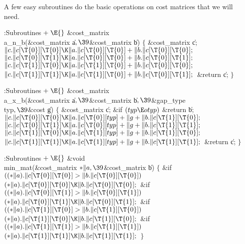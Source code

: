 A few easy subroutines do the basic operations on cost
matrices that we will
need.

\Y\B\4:Subroutines\X${}\mathrel+\E{}$\6
\&{cost\_matrix} \\{a\_n\_b}(\&{cost\_matrix} \|a${},\39{}$\&{cost\_matrix} %
\|b)\6
${}\{{}$\1\6
\&{cost\_matrix} \|c;\7
${}\|c.\|c[\T{0}][\T{0}]\K\|a.\|c[\T{0}][\T{0}]+\|b.\|c[\T{0}][\T{0}];{}$\6
${}\|c.\|c[\T{0}][\T{1}]\K\|a.\|c[\T{0}][\T{0}]+\|b.\|c[\T{0}][\T{1}];{}$\6
${}\|c.\|c[\T{1}][\T{0}]\K\|a.\|c[\T{1}][\T{0}]+\|b.\|c[\T{0}][\T{0}];{}$\6
${}\|c.\|c[\T{1}][\T{1}]\K\|a.\|c[\T{1}][\T{0}]+\|b.\|c[\T{0}][\T{1}];{}$\6
\&{return} \|c;\6
\4${}\}{}$\2\par
\fi

\B{}:Subroutines\X${}\mathrel+\E{}$\6
\&{cost\_matrix} \\{a\_x\_b}(\&{cost\_matrix} \|a${},\39{}$\&{cost\_matrix} %
\|b${},\39{}$\&{gap\_type} \\{typ}${},\39{}$\&{cost} \|g)\6
${}\{{}$\1\6
\&{cost\_matrix} \|c;\7
\&{if} ${}(\\{typ}\E\\{otyp}){}$\1\5
\&{return} \|b;\2\6
${}\|c.\|c[\T{0}][\T{0}]\K\|a.\|c[\T{0}][\\{typ}]+\|g+\|b.\|c[\T{1}][\T{0}];{}$%
\6
${}\|c.\|c[\T{0}][\T{1}]\K\|a.\|c[\T{0}][\\{typ}]+\|g+\|b.\|c[\T{1}][\T{1}];{}$%
\6
${}\|c.\|c[\T{1}][\T{0}]\K\|a.\|c[\T{1}][\\{typ}]+\|g+\|b.\|c[\T{1}][\T{0}];{}$%
\6
${}\|c.\|c[\T{1}][\T{1}]\K\|a.\|c[\T{1}][\\{typ}]+\|g+\|b.\|c[\T{1}][\T{1}];{}$%
\6
\&{return} \|c;\6
\4${}\}{}$\2\par
\fi

\B{}:Subroutines\X${}\mathrel+\E{}$\6
\&{void} \\{min\_mat}(\&{cost\_matrix} ${}{*}\|a,\39{}$\&{cost\_matrix} \|b)\6
${}\{{}$\1\6
\&{if} ${}(({*}\|a).\|c[\T{0}][\T{0}]>\|b.\|c[\T{0}][\T{0}]){}$\1\5
${}({*}\|a).\|c[\T{0}][\T{0}]\K\|b.\|c[\T{0}][\T{0}];{}$\2\6
\&{if} ${}(({*}\|a).\|c[\T{0}][\T{1}]>\|b.\|c[\T{0}][\T{1}]){}$\1\5
${}({*}\|a).\|c[\T{0}][\T{1}]\K\|b.\|c[\T{0}][\T{1}];{}$\2\6
\&{if} ${}(({*}\|a).\|c[\T{1}][\T{0}]>\|b.\|c[\T{1}][\T{0}]){}$\1\5
${}({*}\|a).\|c[\T{1}][\T{0}]\K\|b.\|c[\T{1}][\T{0}];{}$\2\6
\&{if} ${}(({*}\|a).\|c[\T{1}][\T{1}]>\|b.\|c[\T{1}][\T{1}]){}$\1\5
${}({*}\|a).\|c[\T{1}][\T{1}]\K\|b.\|c[\T{1}][\T{1}];{}$\2\6
\4${}\}{}$\2\par
\fi

